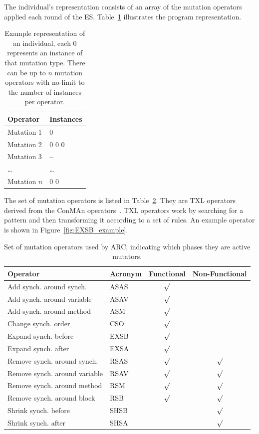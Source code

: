 \documentclass[10pt, conference, compsocconf]{IEEEtran}
\begin{document}
The individual's representation consists of an array of the mutation
operators applied each round of the ES. Table~\ref{tbl:individual_representation}
illustrates the program representation.

\begin{table}[!h]
\begin{center}
\begin{tabular}{|l|l|}
\hline
\textbf{Operator} &
\textbf{Instances}
\\\hline
Mutation 1 & 0
\\\hline
Mutation 2 & 0 0 0
\\\hline
Mutation 3 & --
\\\hline
\ldots & \ldots
\\\hline
Mutation $n$ & 0 0
\\\hline
\end{tabular}
\caption{Example representation of an individual, each 0 represents
an instance of that mutation type. There can be up to $n$ mutation
operators with no-limit to the number of instances per operator.}
\label{tbl:individual_representation}
\end{center}
\end{table}

The set of mutation operators is listed in Table~\ref{tbl:operators}. They are
TXL operators derived from the ConMAn operators~\cite{BCD06}. TXL operators  work by searching for a pattern and then transforming it according to a set of rules.  An example operator is shown in Figure~\ref{fig:EXSB_example}.

\begin{table}
\begin{center}
\begin{tabular}{|l|l|c|c|}
\hline
\textbf{Operator} &
\textbf{Acronym} &
\textbf{Functional} &
\textbf{Non-Functional}
\\\hline
Add synch. around synch. & ASAS & $\surd$ &
\\\hline
Add synch. around variable & ASAV & $\surd$ &
\\\hline
Add synch. around method & ASM & $\surd$ &
\\\hline
Change synch. order & CSO & $\surd$ &
\\\hline
Expand synch. before & EXSB & $\surd$ &
\\\hline
Expand synch. after & EXSA & $\surd$ &
\\\hline
Remove synch. around synch. & RSAS & $\surd$ & $\surd$
\\\hline
Remove synch. around variable & RSAV & $\surd$ & $\surd$
\\\hline
Remove synch. around method & RSM & $\surd$ & $\surd$
\\\hline
Remove synch. around block & RSB & $\surd$ & $\surd$
\\\hline
Shrink synch. before & SHSB & & $\surd$
\\\hline
Shrink synch. after & SHSA & & $\surd$
\\\hline
\end{tabular}
\caption{Set of mutation operators used by ARC, indicating which phases they
are active mutators.}
\label{tbl:operators}
\end{center}
\end{table}
\end{document}
